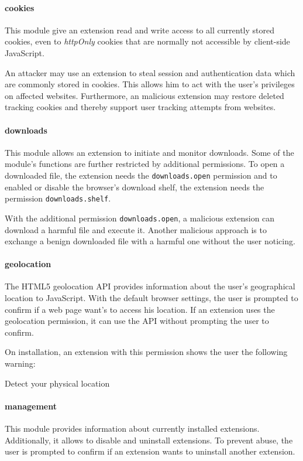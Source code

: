 \paragraph{cookies} 
	This module give an extension read and write access to all currently stored cookies, even to \textit{httpOnly} cookies that are normally not accessible by client-side JavaScript.

	An attacker may use an extension to steal session and authentication data which are commonly stored in cookies. This allows him to act with the user's privileges on affected websites. Furthermore, an malicious extension may restore deleted tracking cookies and thereby support user tracking attempts from websites.

\paragraph{downloads} 
	This module allows an extension to initiate and monitor downloads. Some of the module's functions are further restricted by additional permissions. To open a downloaded file, the extension needs the \texttt{downloads.open} permission and to enabled or disable the browser's download shelf, the extension needs the permission \texttt{downloads.shelf}.  
	
	With the additional permission \texttt{downloads.open}, a malicious extension can download a harmful file and execute it. Another malicious approach is to exchange a benign downloaded file with a harmful one without the user noticing. 

\paragraph{geolocation}
	The HTML5 geolocation API provides information about the user's geographical location to JavaScript. With the default browser settings, the user is prompted to confirm if a web page want's to access his location. If an extension uses the geolocation permission, it can use the API without prompting the user to confirm.
 
	On installation, an extension with this permission shows the user the following warning:
	\begin{permissionwarning}
		Detect your physical location 
	\end{permissionwarning}
			
\paragraph{management}
	This module provides information about currently installed extensions. Additionally, it allows to disable and uninstall extensions. To prevent abuse, the user is prompted to confirm if an extension wants to uninstall another extension. 
	
